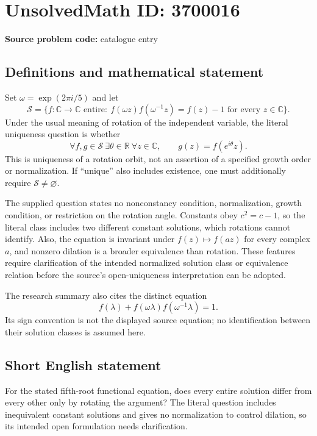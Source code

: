 \documentclass[11pt]{article}
\newcommand{\R}{\mathbb{R}}
\newcommand{\C}{\mathbb{C}}
\begin{document}
\section*{UnsolvedMath ID: 3700016}
\textbf{Source problem code:} catalogue entry
\subsection{Definitions and mathematical statement}
Set $\omega=\exp(2\pi i/5)$ and let
\[
\mathcal S=\{f:\C\to\C\text{ entire}:\ 
 f(\omega z)f(\omega^{-1}z)=f(z)-1\text{ for every }z\in\C\}.
\]
Under the usual meaning of rotation of the independent variable, the literal uniqueness question is whether
\[
\forall f,g\in\mathcal S\ \exists\theta\in\R\ \forall z\in\C,
\qquad g(z)=f(e^{i\theta}z).
\]
This is uniqueness of a rotation orbit, not an assertion of a specified growth order or normalization. If ``unique'' also includes existence, one must additionally require $\mathcal S\ne\varnothing$.

The supplied question states no nonconstancy condition, normalization, growth condition, or restriction on the rotation angle. Constants obey $c^2=c-1$, so the literal class includes two different constant solutions, which rotations cannot identify. Also, the equation is invariant under $f(z)\mapsto f(az)$ for every complex $a$, and nonzero dilation is a broader equivalence than rotation. These features require clarification of the intended normalized solution class or equivalence relation before the source's open-uniqueness interpretation can be adopted.

The research summary also cites the distinct equation
\[
f(\lambda)+f(\omega\lambda)f(\omega^{-1}\lambda)=1.
\]
Its sign convention is not the displayed source equation; no identification between their solution classes is assumed here.
\subsection{Short English statement}
For the stated fifth-root functional equation, does every entire solution differ from every other only by rotating the argument? The literal question includes inequivalent constant solutions and gives no normalization to control dilation, so its intended open formulation needs clarification.
\end{document}
